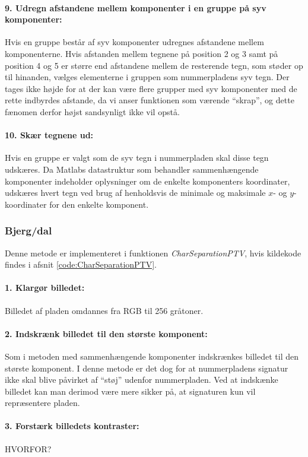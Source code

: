 \paragraph{9. Udregn afstandene mellem komponenter i en gruppe på syv komponenter:} Hvis en gruppe består af syv komponenter udregnes afstandene mellem komponenterne. Hvis afstanden mellem tegnene på position 2 og 3 samt på position 4 og 5 er større end afstandene mellem de resterende tegn, som støder op til hinanden, vælges elementerne i gruppen som nummerpladens syv tegn. Der tages ikke højde for at der kan være flere grupper med syv komponenter med de rette indbyrdes afstande, da vi anser funktionen som værende ``skrap'', og dette fænomen derfor højst sandsynligt ikke vil opstå.

\paragraph{10. Skær tegnene ud:} Hvis en gruppe er valgt som de syv tegn i nummerpladen skal disse tegn udskæres. Da Matlabs datastruktur som behandler sammenhængende komponenter indeholder oplysninger om de enkelte komponenters koordinater, udskæres hvert tegn ved brug af henholdsvis de minimale og maksimale $x$- og $y$-koordinater for den enkelte komponent.

\subsubsection*{Bjerg/dal}
Denne metode er implementeret i funktionen \textit{CharSeparationPTV}, hvis kildekode findes i afsnit \vref{code:CharSeparationPTV}.

\paragraph{1. Klargør billedet:} Billedet af pladen omdannes fra RGB til 256 gråtoner.

\paragraph{2. Indskrænk billedet til den største komponent:} Som i metoden med sammenhængende komponenter indskrænkes billedet til den største komponent. I denne metode er det dog for at nummerpladens signatur ikke skal blive påvirket af ``støj'' udenfor nummerpladen. Ved at indskænke billedet kan man derimod være mere sikker på, at signaturen kun vil repræsentere pladen.

\paragraph{3. Forstærk billedets kontraster:}
HVORFOR?

